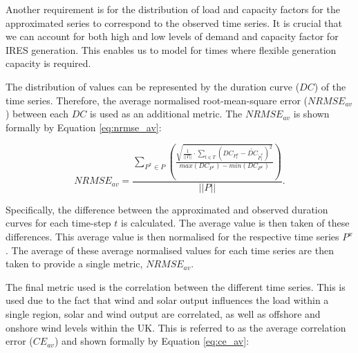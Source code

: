 

Another requirement is for the distribution of load and capacity factors for the approximated series to correspond to the observed time series. It is crucial that we can account for both high and low levels of demand and capacity factor for IRES generation. This enables us to model for times where flexible generation capacity is required.

The distribution of values can be represented by the duration curve ($DC$) of the time series. Therefore, the average normalised root-mean-square error ($NRMSE_{av}$) between each $DC$ is used as an additional metric. The $NRMSE_{av}$ is shown formally by Equation \ref{eq:nrmse_av}:

\begin{equation}
\label{eq:nrmse_av}
NRMSE_{av}=\frac
{\sum\limits_{P^x{\in} P}\left(\frac
	{\sqrt{
			\frac{1}{\left|\left|T\right|\right|}
			\cdot
			\sum\limits_{t\in T}(DC_{P^x_t}-\widetilde{DC}_{\widetilde{P}^x_t})^2}
	}
	{max(DC_{P^x})-min(DC_{P^x})}
	\right)}
{\left|\left|P\right|\right|}.
\end{equation}

Specifically, the difference between the approximated and observed duration curves for each time-step $t$ is calculated. The average value is then taken of these differences. This average value is then normalised for the respective time series $P^x$. The average of these average normalised values for each time series are then taken to provide a single metric, $NRMSE_{av}$.



The final metric used is the correlation between the different time series. This is used due to the fact that wind and solar output influences the load within a single region, solar and wind output are correlated, as well as offshore and onshore wind levels within the UK. This is referred to as the average correlation error ($CE_{av}$) and shown formally by Equation \ref{eq:ce_av}:


